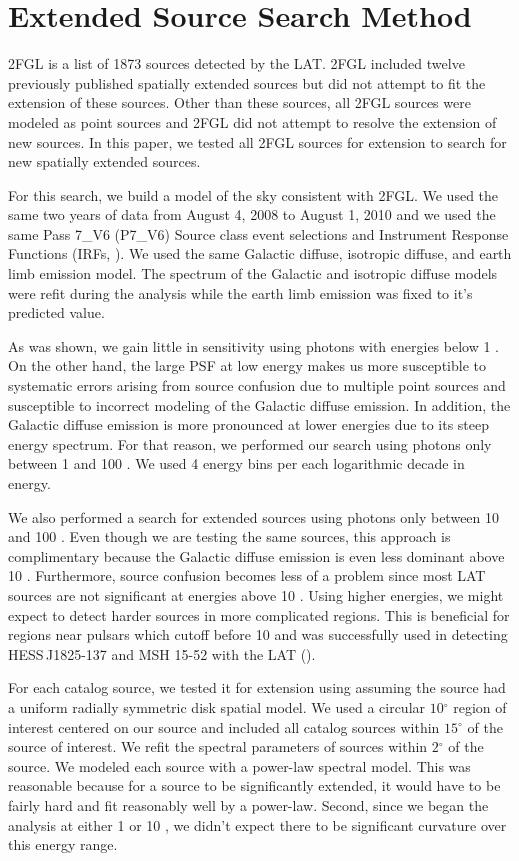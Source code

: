 \documentclass[12pt,preprint]{aastex}
\newcommand{\gev}{\text{GeV}\xspace}
\renewcommand{\deg}{\ensuremath{^\circ}\xspace}
\newcommand{\pointlike}{\text{\em pointlike}\xspace}
\begin{document}
\section{Extended Source Search Method}

2FGL is a list of 1873 \gev sources detected by the LAT.  2FGL included
twelve previously published spatially extended sources but did not
attempt to fit the extension of these sources. Other than these sources,
all 2FGL sources were modeled as point sources and 2FGL did not attempt to
resolve the extension of new sources.  In this paper, we tested all 2FGL
sources for extension to search for new spatially extended \gev sources.

For this search, we build a model of the
sky consistent with 2FGL.   We used the same two
years of data from August 4, 2008 to August 1, 2010 and we used the same
Pass 7\_V6 (P7\_V6) Source class event selections and 
Instrument Response Functions (IRFs, \cite{lat_on_orbit_psf}).  We used the same Galactic diffuse,
isotropic diffuse, and earth limb emission model. The spectrum of the
Galactic and isotropic diffuse models were refit during the analysis
while the earth limb emission was fixed to it's predicted value.

As was shown, we gain little in sensitivity using photons with energies
below 1 \gev. On the other hand, the large PSF at low energy makes us
more susceptible to systematic errors arising from source confusion due
to multiple point sources and susceptible to incorrect modeling of the
Galactic diffuse emission. In addition, the Galactic diffuse emission
is more pronounced at lower energies due to its steep energy spectrum.
For that reason, we performed our search using photons only between 1
\gev and 100 \gev.  We used 4 energy bins per each logarithmic decade
in energy.

We also performed a search for extended sources using photons only
between 10 \gev and 100 \gev. Even though we are testing the same
sources, this approach is complimentary because the Galactic diffuse
emission is even less dominant above 10 \gev. Furthermore, source
confusion becomes less of a problem since most LAT sources are not
significant at energies above 10 \gev.  Using higher energies, we might
expect to detect harder sources in more complicated regions. This is
beneficial for regions near pulsars which cutoff before 10 \gev and was
successfully used in detecting HESS\,J1825-137 and MSH 15-52 with the LAT
(\cite{msh1552,fermi_hess_j1825}).

For each catalog source, we tested it for extension using \pointlike
assuming the source had a uniform radially symmetric disk spatial model.
We used a circular $10\deg$ region of interest centered on our source and
included all catalog sources within $15\deg$ of the source of interest.
We refit the spectral parameters of sources within $2\deg$ of the source.
We modeled each source with a power-law spectral model. This was reasonable because for a source to be significantly
extended, it would have to be fairly hard and fit reasonably well by
a power-law. Second, since we began the analysis at either 1 \gev or
10 \gev, we didn't expect there to be significant curvature over this
energy range.
\end{document}
